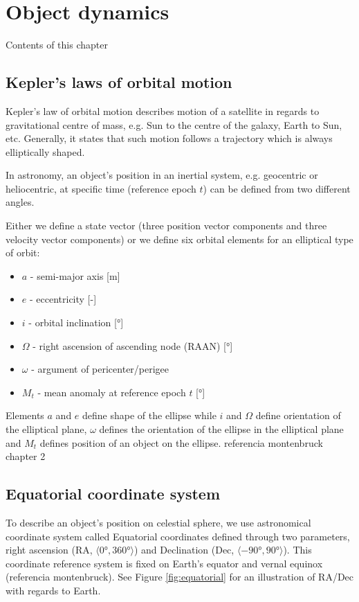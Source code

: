 \chapter{Object dynamics}\label{chap:object_dynamics}

	Contents of this chapter 

\section{Kepler's laws of orbital motion}\label{sec:kepler}
	
	Kepler's law of orbital motion describes motion of a satellite in regards to gravitational centre of mass, e.g. Sun to the centre of the galaxy, Earth to Sun, etc. Generally, it states that such motion follows a trajectory which is always elliptically shaped.
	
	In astronomy, an object's position in an inertial system, e.g. geocentric or heliocentric, at specific time (reference epoch $t$) can be defined from two different angles.
	
	Either we define a state vector (three position vector components and three velocity vector components) or we define six orbital elements for an elliptical type of orbit:
	
	\begin{itemize}
		\item $a$ - semi-major axis [m]
		\item $e$ - eccentricity [-]
		\item $i$ - orbital inclination [°]
		\item $\Omega$ - right ascension of ascending node (RAAN) [°]
		\item $\omega$ - argument of pericenter/perigee
		\item $M_t$ - mean anomaly at reference epoch $t$ [°]
	\end{itemize}
	
	Elements $a$ and $e$ define shape of the ellipse while $i$ and $\Omega$ define orientation of the elliptical plane, $\omega$ defines the orientation of the ellipse in the elliptical plane and $M_t$ defines position of an object on the ellipse.	
	referencia montenbruck chapter 2

\section{Equatorial coordinate system}\label{sec:ra_dec}
	
	To describe an object's position on celestial sphere, we use astronomical coordinate system called Equatorial coordinates defined through two parameters, right ascension (RA, $\langle\ang{0},\ang{360}\rangle$) and Declination (Dec, $\langle\ang{-90},\ang{90}\rangle$). This coordinate reference system is fixed on Earth's equator and vernal equinox (referencia montenbruck). See Figure \ref{fig:equatorial} for an illustration of RA/Dec with regards to Earth.
	
